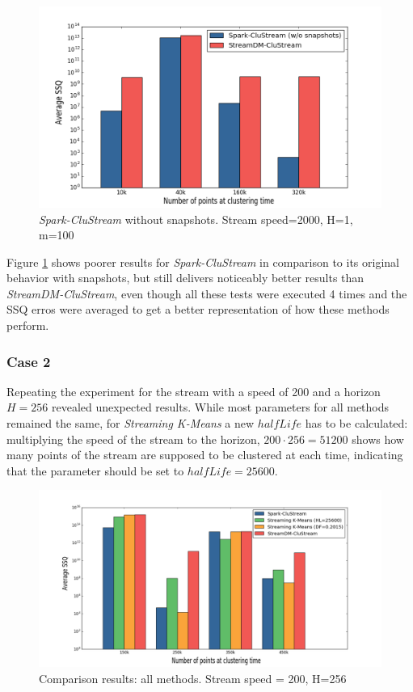 \begin{figure}[h]
 \centering
 \includegraphics[scale=0.4]{./styles/comparisonNoSnaps.png}
 \caption{\textit{Spark-CluStream} without snapshots. Stream speed=2000, H=1, m=100}
 \label{fig:comparisonNoSnaps}
\end{figure}

Figure \ref{fig:comparisonNoSnaps} shows poorer results for \textit{Spark-CluStream} in comparison to its original behavior with snapshots, but still delivers noticeably better results than \textit{StreamDM-CluStream}, even though all these tests were executed 4 times and the SSQ erros were averaged to get a better representation of how these methods perform.

\subsubsection{Case 2}

Repeating the experiment for the stream with a speed of 200 and a horizon $H=256$ revealed unexpected results. While most parameters for all methods remained the same, for \textit{Streaming K-Means} a new $halfLife$ has to be calculated: multiplying the speed of the stream to the horizon, $200\cdot 256=51200$ shows how many points of the stream are supposed to be clustered at each time, indicating that the parameter should be set to $halfLife=25600$. 

\begin{figure}[h!]
 \centering
 \includegraphics[scale=0.37]{./styles/comparison200.png}
 \caption{Comparison results: all methods. Stream speed = 200, H=256}
 \label{fig:comparison200}
\end{figure}

